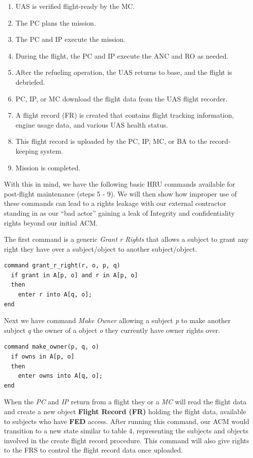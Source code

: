 \documentclass[10pt,journal,compsoc]{IEEEtran}
\begin{document}
  \begin{enumerate}
    \item UAS is verified flight-ready by the MC.
    \item The PC plans the mission.
    \item The PC and IP execute the mission.
    \item During the flight, the PC and IP execute the ANC and RO as needed.
    \item After the refueling operation, the UAS returns to base, and the flight is debriefed. 
    \item PC, IP, or MC download the flight data from the UAS flight recorder. 
    \item A flight record (FR) is created that contains flight tracking information, engine usage data, and various UAS health status.
    \item This flight record is uploaded by the PC, IP, MC, or BA to the record-keeping system. 
    \item Mission is completed. 
  \end{enumerate}
  
  With this in mind, we have the following basic HRU commands available for post-flight maintenance (steps 5 - 9). We will then show how improper use of these commands can lead to a rights leakage with our external contractor standing in as our ``bad actor'' gaining a leak of Integrity and confidentiality rights beyond our initial ACM. 

  The first command is a generic \textit{Grant r Rights} that allows a subject to grant any right they have over a subject/object to another subject/object.

\begin{lstlisting}
command grant_r_right(r, o, p, q)
  if grant in A[p, o] and r in A[p, o]
  then
    enter r into A[q, o];
end
\end{lstlisting}
    
  Next we have command \textit{Make Owner} allowing a subject \textit{p} to make another subject \textit{q} the owner of a object \textit{o} they currently have owner rights over. 

\begin{lstlisting}
command make_owner(p, q, o)
  if owns in A[p, o]
  then
    enter owns into A[q, o];
end
\end{lstlisting}
  
  When the \textit{PC} and \textit{IP} return from a flight they or a \textit{MC} will read the flight data and create a new object \textbf{Flight Record (FR)} holding the flight data, available to subjects who have \textbf{FED} access. 
  After running this command, our ACM would transition to a new state similar to table 4, representing the subjects and objects involved in the create flight record procedure. 
  This command will also give rights to the FRS to control the flight record data once uploaded.
  
\end{document}
